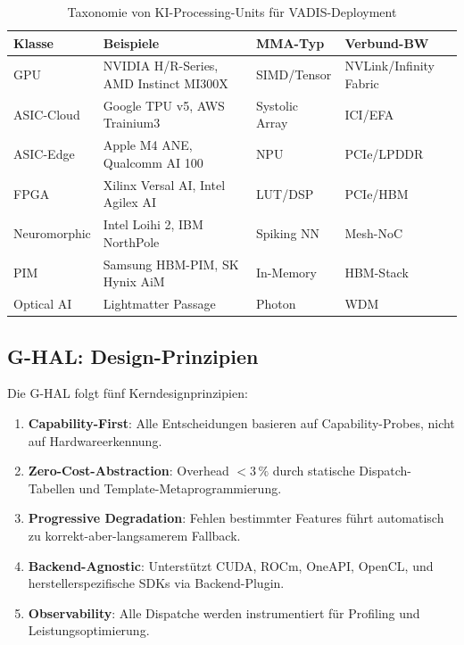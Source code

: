 ﻿\documentclass[12pt,a4paper]{article}
\begin{document}
\begin{table}[ht]
\centering
\small
\caption{Taxonomie von KI-Processing-Units für VADIS-Deployment}
\label{tab:aipu_taxonomy}
\begin{tabular}{@{}p{2.0cm}p{2.5cm}p{2.5cm}p{1.5cm}@{}}
\toprule
\textbf{Klasse} & \textbf{Beispiele} & \textbf{MMA-Typ} & \textbf{Verbund-BW} \\
\midrule
GPU & NVIDIA H/R-Series, AMD Instinct MI300X & SIMD/Tensor & NVLink/Infinity Fabric \\
ASIC-Cloud & Google TPU v5, AWS Trainium3 & Systolic Array & ICI/EFA \\
ASIC-Edge & Apple M4 ANE, Qualcomm AI 100 & NPU & PCIe/LPDDR \\
FPGA & Xilinx Versal AI, Intel Agilex AI & LUT/DSP & PCIe/HBM \\
Neuromorphic & Intel Loihi 2, IBM NorthPole & Spiking NN & Mesh-NoC \\
PIM & Samsung HBM-PIM, SK Hynix AiM & In-Memory & HBM-Stack \\
Optical AI & Lightmatter Passage & Photon & WDM \\
\bottomrule
\end{tabular}
\end{table}

\subsection{G-HAL: Design-Prinzipien}
\label{sub:ghal_design}

Die G-HAL folgt fünf Kerndesignprinzipien:

\begin{tcolorbox}[keybox, title={G-HAL Design-Prinzipien}]
\small
\begin{enumerate}[leftmargin=1.2em, itemsep=2pt, topsep=0pt]
  \item \textbf{Capability-First}: Alle Entscheidungen basieren
        auf Capability-Probes, nicht auf Hardwareerkennung.
  \item \textbf{Zero-Cost-Abstraction}: Overhead $< 3\,\%$ durch
        statische Dispatch-Tabellen und Template-Metaprogrammierung.
  \item \textbf{Progressive Degradation}: Fehlen bestimmter Features
        führt automatisch zu korrekt-aber-langsamerem Fallback.
  \item \textbf{Backend-Agnostic}: Unterstützt CUDA, ROCm, OneAPI,
        OpenCL, und herstellerspezifische SDKs via Backend-Plugin.
  \item \textbf{Observability}: Alle Dispatche werden instrumentiert
        für Profiling und Leistungsoptimierung.
\end{enumerate}
\end{tcolorbox}
\end{document}
